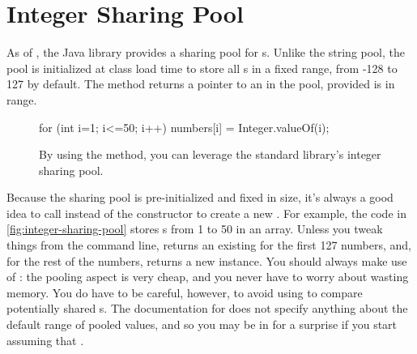 \section{Integer Sharing Pool}

As of \javafive, the Java library provides a sharing pool for s.
Unlike the string pool, the  pool is initialized at class load
time to store all s in a fixed range, from -128 to 127 by
default. The method  returns a pointer to an
 in the pool, provided  is in range.

\begin{figure}
\centering
\begin{framedlisting}
for (int i=1; i<=50; i++) {
 numbers[i] = Integer.valueOf(i);
}
\end{framedlisting}
\caption{By using the  method, you can leverage the standard
library's integer sharing pool.}
\label{fig:integer-sharing-pool}
\end{figure}
Because the  sharing pool is pre-initialized and fixed in size,
it's always a good idea to call  instead of the
constructor to create a new . For example, the code in
\autoref{fig:integer-sharing-pool} stores s from 1 to 50 in an
array. Unless you tweak things from the command line,
 returns an existing 
for the first 127 numbers, and, for the rest of the numbers, 
returns a new  instance. You should always make use of
: the pooling aspect is very cheap, and you never have to
worry about wasting memory. You do have to be careful, however, to avoid using
\code{==} to compare potentially shared s. The documentation for
 does not specify anything about the default range of pooled
values, and so you may be in for a surprise if you start assuming that
.

